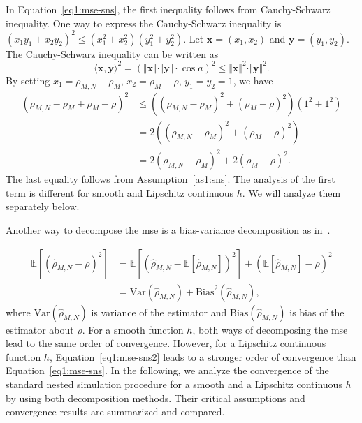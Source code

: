 In Equation~\eqref{eq1:mse-sns}, the first inequality follows from Cauchy-Schwarz inequality.
One way to express the Cauchy-Schwarz inequality is 
$(x_1y_1 + x_2y_2)^2 \leq (x_1^2 + x_2^2)(y_1^2 + y_2^2)$.
Let $\mathbf{x} = (x_1, x_2)$ and $\mathbf{y} = (y_1, y_2)$.
The Cauchy-Schwarz inequality can be written as
\begin{equation*}
    \langle \mathbf{x}, \mathbf{y} \rangle^2  = \left( \Vert \mathbf{x} \Vert \cdot \Vert \mathbf{y} \Vert \cdot \cos a \right)^2 \leq \Vert \mathbf{x} \Vert^2 \cdot \Vert \mathbf{y} \Vert^2.
\end{equation*}
By setting $x_1 = \rho_{M,N}- \rho_M$, $x_2 = \rho_M - \rho$, $y_1 = y_2 = 1$, we have 
\begin{align*}
    \left( \rho_{M,N} - \rho_M + \rho_M - \rho \right)^2 
    & \leq \left( (\rho_{M,N} - \rho_M)^2 + (\rho_M - \rho)^2 \right) \left( 1^2 + 1^2 \right) \\
    & = 2 \left( (\rho_{M,N} - \rho_M)^2 + (\rho_M - \rho)^2 \right) \\
    & = 2  (\rho_{M,N} - \rho_M)^2 + 2 (\rho_M - \rho)^2.
\end{align*}
The last equality follows from Assumption~\ref{as1:sns}.
The analysis of the first term is different for smooth and Lipschitz continuous $h$. 
We will analyze them separately below.

Another way to decompose the \gls{mse} is a bias-variance decomposition as in~\cite{gordy2010nested}.

\begin{align}\label{eq1:mse-sns2}
    \mathbb{E} \left[ \left( \hat{\rho}_{M, N} - \rho \right)^2 \right] 
    & = \mathbb{E} \left[ \left( \hat{\rho}_{M, N} - \mathbb{E} \left[ \hat{\rho}_{M, N} \right] \right)^2 \right] + \left( \mathbb{E} \left[ \hat{\rho}_{M, N} \right] - \rho \right)^2 \nonumber \\
    & = \text{Var}(\hat{\rho}_{M, N}) + \text{Bias}^2(\hat{\rho}_{M, N}),
\end{align}
where $\text{Var}(\hat{\rho}_{M, N})$ is variance of the estimator and $\text{Bias}(\hat{\rho}_{M, N})$ is bias of the estimator about $\rho$.
For a smooth function $h$, both ways of decomposing the \gls{mse} lead to the same order of convergence.
However, for a Lipschitz continuous function $h$, Equation~\eqref{eq1:mse-sns2} leads to a stronger order of convergence than Equation~\eqref{eq1:mse-sns}.
In the following, we analyze the convergence of the standard nested simulation procedure for a smooth and a Lipschitz continuous $h$ by using both decomposition methods.
Their critical assumptions and convergence results are summarized and compared.

